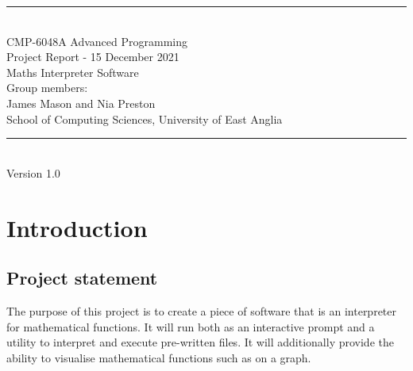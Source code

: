 \documentclass[a4paper, oneside, 11pt]{report}
\begin{document}
\begin{titlepage}
\begin{center}
\rule{12cm}{1mm} \\
\vspace{1cm}
{\large  CMP-6048A Advanced Programming}
\vspace{7.5cm}
\\{\Large Project Report - 15 December 2021}
\vspace{1.5cm}
\\{\LARGE Maths Interpreter Software}
\vspace{1.0cm}
\\{\Large Group members: \\ James Mason and Nia Preston}
\vspace{10.0cm}
\\{\large School of Computing Sciences, University of East Anglia}
\\ \rule{12cm}{0.5mm}
\\ \hspace{8.5cm} {\large Version 1.0}
\end{center}
\end{titlepage}


\setcounter{page}{1}


\begin{abstract}
An abstract is a brief summary (maximum 250 words) of your entire project. It should cover your objectives, your methodology used, how you implemented the methodology for your specific results and what your final results are, your final outcome or deliverable and conclusion. You do not cover literature reviews or background in an abstract nor should you use abbreviations or acronyms. In the remainder of the report the chapter titles are suggestions and can be changed (or you can add more chapters if you wish to do so). This template is designed to help you write a clear report but you are welcome to modify it (at your peril ...). Finally, a guideline in size is approximately 3,500 words (not including abstract, captions and references) but no real limit on figures, tables, etc.
\end{abstract}

\chapter{Introduction}
\label{chap:intro}


\section{Project statement}
The purpose of this project is to create a piece of software that is an interpreter for mathematical functions. It will run both as an interactive prompt and a utility to interpret and execute pre-written files.
It will additionally provide the ability to visualise mathematical functions such as on a graph.
\end{document}
